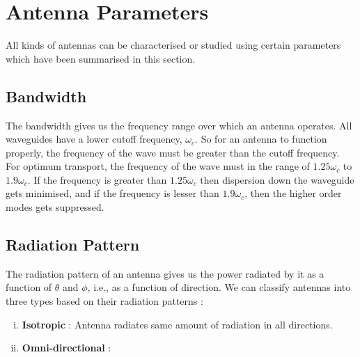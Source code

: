 \documentclass[12pt]{article}
\begin{document}
\section{Antenna Parameters}
All kinds of antennas can be characterised or studied using certain parameters which have been summarised in this section. 
\subsection{Bandwidth}
The bandwidth gives us the frequency range over which an antenna operates. All waveguides have a lower cutoff frequency, $\omega_c$. So for an antenna to function properly, the frequency of the wave must be greater than the cutoff frequency. For optimum transport, the frequency of the wave must in the range of $1.25 \omega_c$ to $1.9\omega_c$. If the frequency is greater than $1.25\omega_c$ then dispersion down the waveguide gets minimised, and if the frequency is lesser than $1.9\omega_c$, then the higher order modes gets suppressed. 
\subsection{Radiation Pattern}
The radiation pattern of an antenna gives us the power radiated by it as a function of $\theta$ and $\phi$, i.e., as a function of direction. \linebreak
We can classify antennas into three types based on their radiation patterns :
\begin{enumerate}[i.)]
  \item \textbf{Isotropic} : Antenna radiates same amount of radiation in all directions.
  \item \textbf{Omni-directional} : 
\end{enumerate}
\end{document}
